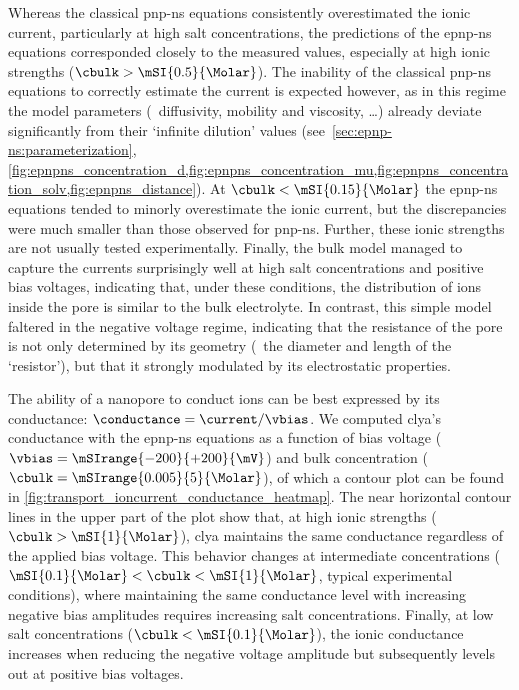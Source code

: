 Whereas the classical \gls{pnp-ns} equations consistently overestimated the ionic current, particularly at
high salt concentrations, the predictions of the \gls{epnp-ns} equations corresponded closely to the measured
values, especially at high ionic strengths ($\cbulk > \mSI{0.5}{\Molar}$). The inability of the classical
\gls{pnp-ns} equations to correctly estimate the current is expected however, as in this regime the model
parameters (\eg~diffusivity, mobility and viscosity, \ldots) already deviate significantly from their
`infinite dilution' values (see~\cref{sec:epnp-ns:parameterization},
\cref{fig:epnpns_concentration_d,fig:epnpns_concentration_mu,fig:epnpns_concentration_solv,fig:epnpns_distance}).
At $\cbulk < \mSI{0.15}{\Molar}$ the \gls{epnp-ns} equations tended to minorly overestimate the ionic current,
but the discrepancies were much smaller than those observed for \gls{pnp-ns}. Further, these ionic strengths
are not usually tested experimentally. Finally, the bulk model managed to capture the currents surprisingly
well at high salt concentrations and positive bias voltages, indicating that, under these conditions, the
distribution of ions inside the pore is similar to the bulk electrolyte. In contrast, this simple model
faltered in the negative voltage regime, indicating that the resistance of the pore is not only determined by
its geometry (\ie~the diameter and length of the `resistor'), but that it strongly modulated by its
electrostatic properties.

The ability of a nanopore to conduct ions can be best expressed by its conductance: $\conductance = \current /
\vbias$. We computed \gls{clya}'s conductance with the \gls{epnp-ns} equations as a function of bias voltage
($\vbias = \mSIrange{-200}{+200}{\mV}$) and bulk  concentration ($\cbulk =
\mSIrange{0.005}{5}{\Molar}$), of which a contour plot can be found in
\cref{fig:transport_ioncurrent_conductance_heatmap}. The near horizontal contour lines in the upper part of
the plot show that, at high ionic strengths ($\cbulk > \mSI{1}{\Molar}$), \gls{clya} maintains the same
conductance regardless of the applied bias voltage. This behavior changes at intermediate concentrations
($\mSI{0.1}{\Molar} < \cbulk < \mSI{1}{\Molar}$, typical experimental conditions), where maintaining the same
conductance level with increasing negative bias amplitudes requires increasing salt concentrations. Finally,
at low salt concentrations ($\cbulk < \mSI{0.1}{\Molar}$), the ionic conductance increases when reducing the
negative voltage amplitude but subsequently levels out at positive bias voltages.

